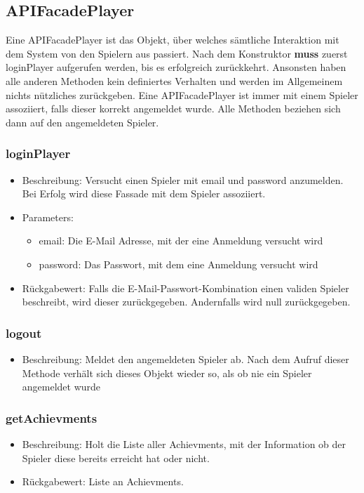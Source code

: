 \documentclass[a4paper]{scrreprt}
\begin{document}
	\subsection{APIFacadePlayer}
	Eine APIFacadePlayer ist das Objekt, über welches sämtliche Interaktion mit dem System von den Spielern aus passiert. Nach dem Konstruktor \textbf{muss} zuerst loginPlayer aufgerufen werden, bis es erfolgreich zurückkehrt. Ansonsten haben alle anderen Methoden kein definiertes Verhalten und werden im Allgemeinem nichts nützliches zurückgeben. Eine APIFacadePlayer ist immer mit einem Spieler assoziiert, falls dieser korrekt angemeldet wurde. Alle Methoden beziehen sich dann auf den angemeldeten Spieler.
	\subsubsection{loginPlayer}
	\begin{itemize}
		\item Beschreibung: Versucht einen Spieler mit email und password anzumelden. Bei Erfolg wird diese Fassade mit dem Spieler assoziiert.
		\item Parameters:
		\begin{itemize}
			\item email: Die E-Mail Adresse, mit der eine Anmeldung versucht wird
			\item password: Das Passwort, mit dem eine Anmeldung versucht wird
		\end{itemize}
		\item Rückgabewert: Falls die E-Mail-Passwort-Kombination einen validen Spieler beschreibt, wird dieser zurückgegeben. Andernfalls wird null zurückgegeben.
	\end{itemize}
	\subsubsection{logout}
	\begin{itemize}
		\item Beschreibung: Meldet den angemeldeten Spieler ab. Nach dem Aufruf dieser Methode verhält sich dieses Objekt wieder so, als ob nie ein Spieler angemeldet wurde
	\end{itemize}
	\subsubsection{getAchievments}
	\begin{itemize}
		\item Beschreibung: Holt die Liste aller Achievments, mit der Information ob der Spieler diese bereits erreicht hat oder nicht.
		\item Rückgabewert: Liste an Achievments.
	\end{itemize}
\end{document}
